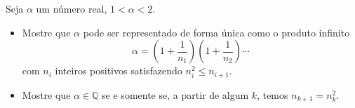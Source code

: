 Seja \(\alpha\) um número real, \(1<\alpha<2\).
\begin{itemize}

\item[(a)] Mostre que \(\alpha\) pode ser representado de forma única como o produto infinito \[ \alpha = \left(1+\dfrac1{n_1}\right)\left(1+\dfrac1{n_2}\right)\cdots \] com \(n_i\) inteiros positivos satisfazendo \(n_i^2\le n_{i+1}\).

\item[(b)] Mostre que \(\alpha\in\mathbb{Q}\) se e somente se, a partir de algum \(k\), temos \(n_{k+1}=n_k^2\).
\end{itemize}
